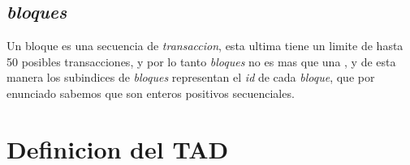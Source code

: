 \documentclass[10pt,a4paper]{article}
\begin{document}
\subsection{\textit{bloques}}
Un bloque es una secuencia de \textit{transaccion}, esta ultima tiene un limite de hasta 50 posibles transacciones, y por lo tanto \textit{bloques} no es mas que una , y de esta manera los subindices de \textit{bloques} representan el \textit{id} de cada \textit{bloque}, que por enunciado sabemos que son enteros positivos secuenciales.

\vspace{0.3cm}

\section{Definicion del TAD}
\noindent
\end{document}
